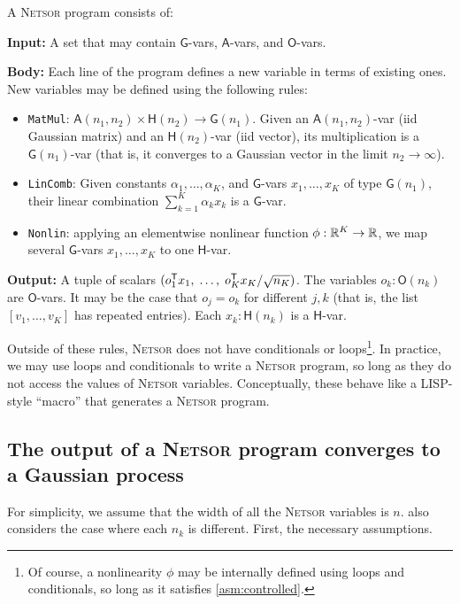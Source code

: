 \documentclass[accepted]{uai2021} %
\newcommand{\Netsor}{\textsc{Netsor}\xspace}
\newcommand{\Gva}{\mathsf{G}}
\newcommand{\Hva}{\mathsf{H}}
\newcommand{\Ava}{\mathsf{A}}
\newcommand{\Ova}{\mathsf{O}}
\newcommand{\MatMul}{\texttt{MatMul}\xspace}
\newcommand{\LinComb}{\texttt{LinComb}\xspace}
\newcommand{\Nonlin}{\texttt{Nonlin}\xspace}
\newcommand{\0}{\boldsymbol{0}}
\newcommand{\1}{\boldsymbol{1}}
\begin{document}
\begin{definition}
A \textsc{Netsor} program consists of:

\textbf{Input:}
 A set that may contain $\Gva$-vars, $\Ava$-vars, and $\Ova$-vars.

\textbf{Body:}
Each line of the program defines a new variable in terms of existing ones.
New variables may be defined using the following rules:
\begin{itemize}
  \item\MatMul: $\Ava(n_1, n_2) \times \Hva(n_2) \to \Gva(n_1)$. Given
        an $\Ava(n_{1}, n_{2})$-var (\ac{iid} Gaussian matrix) and an $\Hva(n_{2})$-var (\ac{iid} vector), its multiplication is a $\Gva(n_{1})$-var (that is, it
        converges to a Gaussian vector in the limit $n_2 \to \infty$).
  \item\LinComb: Given constants $\alpha_1,\dots,\alpha_K$, and $\Gva$-vars
    $x_1,\dots,x_K$ of type $\Gva(n_1)$, their linear combination $\sum_{k=1}^K \alpha_k
    x_k$ is a $\Gva$-var.
  \item\Nonlin: applying an elementwise nonlinear function $\phi : {\mathbb{R}}^K \to
    {\mathbb{R}}$, we map
    several $\Gva$-vars $x_1,\dots,x_K$ to one $\Hva$-var.
\end{itemize}

\textbf{Output:}
A tuple of scalars $(o_1^{\mathsf{T}} x_1, \;\dots, \; o_K^{\mathsf{T}}
x_K/\sqrt{n_K})$. The variables $o_k : \Ova(n_{k})$ are $\Ova$-vars. It may be the case that $o_j = o_k$ for
different $j, k$ (that is, the list $[v_{1},\dots,v_{K}]$ has repeated entries). Each $x_k : \Hva(n_k)$ is a $\Hva$-var.
\end{definition}

Outside of these rules, \Netsor does not have conditionals or loops\footnote{Of course, a nonlinearity $\phi$ may be internally defined using loops and conditionals, so long as it satisfies \cref{asm:controlled}.}. In
practice, we may use loops and conditionals to write a \Netsor program, so long
as they do not access the values of \Netsor variables. Conceptually, these
behave like a LISP-style ``macro'' that generates a \Netsor program.


\subsection{The output of a \Netsor program converges to a Gaussian process}\label{sec:netsor-converges}
For simplicity, we assume that the width of all the \Netsor variables is $n$.
 also considers the case where each $n_{k}$ is different. First, the necessary assumptions.
\end{document}
